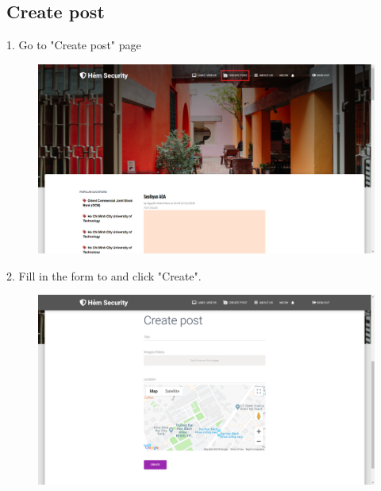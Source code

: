 \subsection{Create post}
1. Go to "Create post" page
\begin{center}
    \begin{figure}[H]
    \centering
    \includegraphics[width=1\columnwidth]{images/chap6/instruction7.png}
    \end{figure}
\end{center}
2. Fill in the form to and click "Create". 
\begin{center}
    \begin{figure}[H]
    \centering
    \includegraphics[width=1\columnwidth]{images/chap6/instruction8.png}
    \end{figure}
\end{center}
